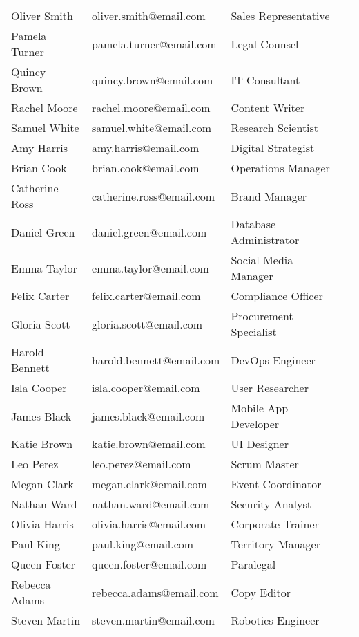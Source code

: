 {\begin{longtable}[c]{llll}
		Oliver Smith   & oliver.smith@email.com   & Sales Representative      \\
		Pamela Turner  & pamela.turner@email.com  & Legal Counsel             \\
		Quincy Brown   & quincy.brown@email.com   & IT Consultant             \\
		Rachel Moore   & rachel.moore@email.com   & Content Writer            \\
		Samuel White   & samuel.white@email.com   & Research Scientist        \\
		Amy Harris     & amy.harris@email.com     & Digital Strategist        \\
		Brian Cook     & brian.cook@email.com     & Operations Manager        \\
		Catherine Ross & catherine.ross@email.com & Brand Manager             \\
		Daniel Green   & daniel.green@email.com   & Database Administrator    \\
		Emma Taylor    & emma.taylor@email.com    & Social Media Manager      \\
		Felix Carter   & felix.carter@email.com   & Compliance Officer        \\
		Gloria Scott   & gloria.scott@email.com   & Procurement Specialist    \\
		Harold Bennett & harold.bennett@email.com & DevOps Engineer           \\
		Isla Cooper    & isla.cooper@email.com    & User Researcher           \\
		James Black    & james.black@email.com    & Mobile App Developer      \\
		Katie Brown    & katie.brown@email.com    & UI Designer               \\
		Leo Perez      & leo.perez@email.com      & Scrum Master              \\
		Megan Clark    & megan.clark@email.com    & Event Coordinator         \\
		Nathan Ward    & nathan.ward@email.com    & Security Analyst          \\
		Olivia Harris  & olivia.harris@email.com  & Corporate Trainer         \\
		Paul King      & paul.king@email.com      & Territory Manager         \\
		Queen Foster   & queen.foster@email.com   & Paralegal                 \\
		Rebecca Adams  & rebecca.adams@email.com  & Copy Editor               \\
		Steven Martin  & steven.martin@email.com  & Robotics Engineer         \\
	\end{longtable}

}
